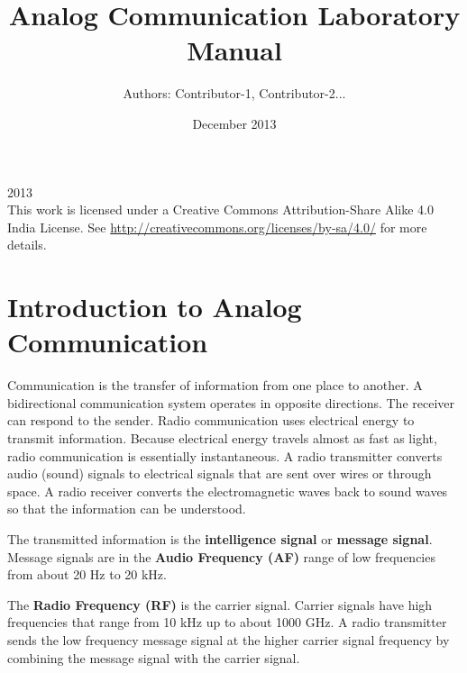 \documentclass{book}
\begin{document}
\thispagestyle{empty}
\thispagestyle{empty}

\title{Analog Communication
Laboratory Manual}
\date{December 2013}
\author {Authors: Contributor-1, Contributor-2...}
\maketitle
  
\textcopyright{}2013
\\[5cm]
    This work is licensed under a Creative Commons Attribution-Share Alike 4.0 India License. See \url{http://creativecommons.org/licenses/by-sa/4.0/} for more details.






\thispagestyle{empty}
\tableofcontents
\thispagestyle{empty}
\thispagestyle{empty}

\listoffigures
\thispagestyle{empty}

\chapter [Introduction to Analog Communication]{Introduction to Analog Communication}


\cite{ACmanual}Communication is the transfer of information from one place to another. A bidirectional communication system operates in opposite directions. The receiver can respond
to the sender. Radio communication uses electrical energy to transmit information. Because electrical energy travels almost as fast as light, radio communication is essentially instantaneous.
A radio transmitter converts audio (sound) signals to electrical signals that are sent over wires or through space. A radio receiver converts the electromagnetic waves back to sound waves so that the
information can be understood. 

The transmitted information is the \textbf {intelligence signal} or \textbf{ message signal}.
 Message signals are in the \textbf {Audio Frequency (AF)} range of low frequencies from about 20 Hz to 20 kHz.
 
 
The \textbf{Radio Frequency (RF)}  is the carrier signal. Carrier signals have high frequencies that range from 10 kHz up to about 1000 GHz.
A radio transmitter sends the low frequency message signal at the higher carrier signal frequency by combining the message signal with the carrier signal.
\end{document}
